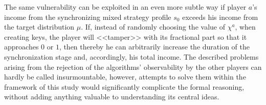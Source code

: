 The same vulnerability can be exploited in an even more subtle way if player $a$'s income from the synchronizing mixed strategy profile $s_0$ exceeds his income from the target distribution $\mu$. If, instead of randomly choosing the value of $\chi^a$, when creating keys, the player will <<tamper>> with its fractional part so that it approaches $0$ or $1$, then thereby he can arbitrarily increase the duration of the synchronization stage and, accordingly, his total income. The described problems arising from the rejection of the algorithms' observability by the other players can hardly be called insurmountable, however, attempts to solve them within the framework of this study would significantly complicate the formal reasoning, without adding anything valuable to understanding its central ideas. %


